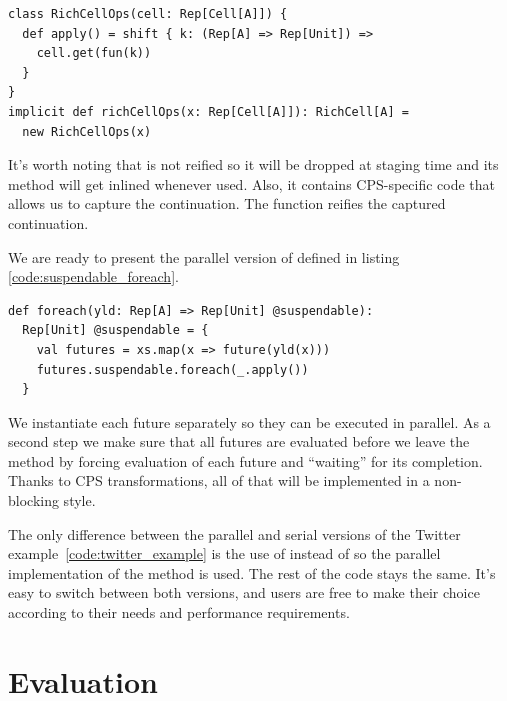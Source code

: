 \documentclass[runningheads,a4paper]{llncs}
\begin{document}
\begin{lstlisting}
class RichCellOps(cell: Rep[Cell[A]]) {
  def apply() = shift { k: (Rep[A] => Rep[Unit]) =>
    cell.get(fun(k))
  }
}
implicit def richCellOps(x: Rep[Cell[A]]): RichCell[A] =
  new RichCellOps(x)
\end{lstlisting}

It's worth noting that  is not reified so it will be dropped at staging time and its method will get inlined whenever used. Also, it contains CPS-specific code that allows us to capture the continuation. The  function reifies the captured continuation.

We are ready to present the parallel version of  defined in listing \ref{code:suspendable_foreach}.

\begin{lstlisting}
def foreach(yld: Rep[A] => Rep[Unit] @suspendable):
  Rep[Unit] @suspendable = {
    val futures = xs.map(x => future(yld(x)))
    futures.suspendable.foreach(_.apply())
  }
\end{lstlisting}

We instantiate each future separately so they can be executed in parallel. As a second step we make sure that all futures are evaluated before we leave the  method by forcing evaluation of each future and ``waiting'' for its completion. Thanks to CPS transformations, all of that will be implemented in a non-blocking style.

The only difference between the parallel and serial versions of the Twitter example~\ref{code:twitter_example} is the use of  instead of  so the parallel implementation of the  method is used. The rest of the code stays the same. It's easy to switch between both versions, and users are free to make their choice according to their needs and performance requirements.



\section{Evaluation}\label{sec:eval}
\end{document}
